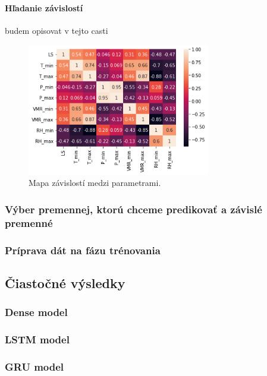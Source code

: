 \paragraph{Hľadanie závislostí} budem opisovat v tejto casti
\begin{figure}[!htbp]
  \centering
  \includegraphics[width=8cm]{img/heatmap.png}
  \caption{Mapa závislostí medzi parametrami.}
  \label{heatmap}
\end{figure}






\subsubsection{Výber premennej, ktorú chceme predikovať a závislé premenné}
\subsubsection{Príprava dát na fázu trénovania}


\newpage

\subsection{Čiastočné výsledky}

\subsubsection{Dense model} 
\subsubsection{LSTM model} 
\subsubsection{GRU model} 
